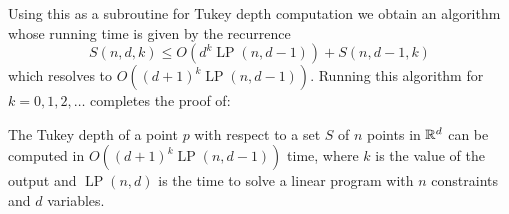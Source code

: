 \documentclass[charterfonts,lotsofwhite]{patmorin}
\DeclareMathOperator{\lp}{LP}
\begin{document}
Using this as a subroutine for Tukey depth computation we obtain an
algorithm whose running time is given by the recurrence
\[
    S(n,d,k) \le O(d^k\lp(n,d-1)) + S(n,d-1,k)
\]
which resolves to $O((d+1)^k\lp(n,d-1))$.  Running this algorithm for
$k=0,1,2,\ldots$ completes the proof of:

\begin{thm}
The Tukey depth of a point $p$ with respect to a set $S$ of $n$ points
in $\mathbb{R}^d$ can be computed in $O((d+1)^k\lp(n,d-1))$ time, where $k$ is
the value of the output and $\lp(n,d)$ is the time to solve a linear
program with $n$ constraints and $d$ variables.
\end{thm}



\end{document}
